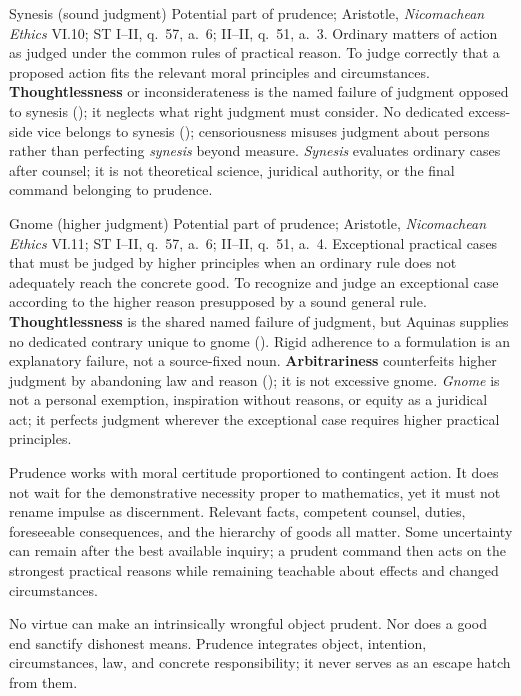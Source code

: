 \virtuedossier
  {Synesis (sound judgment)}
  {Potential part of prudence; Aristotle, \emph{Nicomachean Ethics} VI.10; ST I--II, q.~57, a.~6; II--II, q.~51, a.~3.}
  {Ordinary matters of action as judged under the common rules of practical reason.}
  {To judge correctly that a proposed action fits the relevant moral principles and circumstances.}
  {\textbf{Thoughtlessness} or inconsiderateness is the named failure of judgment opposed to synesis (); it neglects what right judgment must consider.}
  {No dedicated excess-side vice belongs to synesis (); censoriousness misuses judgment about persons rather than perfecting \emph{synesis} beyond measure.}
  {\emph{Synesis} evaluates ordinary cases after counsel; it is not theoretical science, juridical authority, or the final command belonging to prudence.}

\virtuedossier
  {Gnome (higher judgment)}
  {Potential part of prudence; Aristotle, \emph{Nicomachean Ethics} VI.11; ST I--II, q.~57, a.~6; II--II, q.~51, a.~4.}
  {Exceptional practical cases that must be judged by higher principles when an ordinary rule does not adequately reach the concrete good.}
  {To recognize and judge an exceptional case according to the higher reason presupposed by a sound general rule.}
  {\textbf{Thoughtlessness} is the shared named failure of judgment, but Aquinas supplies no dedicated contrary unique to gnome (). Rigid adherence to a formulation is an explanatory failure, not a source-fixed noun.}
  {\textbf{Arbitrariness} counterfeits higher judgment by abandoning law and reason (); it is not excessive gnome.}
  {\emph{Gnome} is not a personal exemption, inspiration without reasons, or equity as a juridical act; it perfects judgment wherever the exceptional case requires higher practical principles.}


Prudence works with moral certitude proportioned to contingent action. It does not wait for the demonstrative necessity proper to mathematics, yet it must not rename impulse as discernment. Relevant facts, competent counsel, duties, foreseeable consequences, and the hierarchy of goods all matter. Some uncertainty can remain after the best available inquiry; a prudent command then acts on the strongest practical reasons while remaining teachable about effects and changed circumstances.

No virtue can make an intrinsically wrongful object prudent. Nor does a good end sanctify dishonest means. Prudence integrates object, intention, circumstances, law, and concrete responsibility; it never serves as an escape hatch from them.
